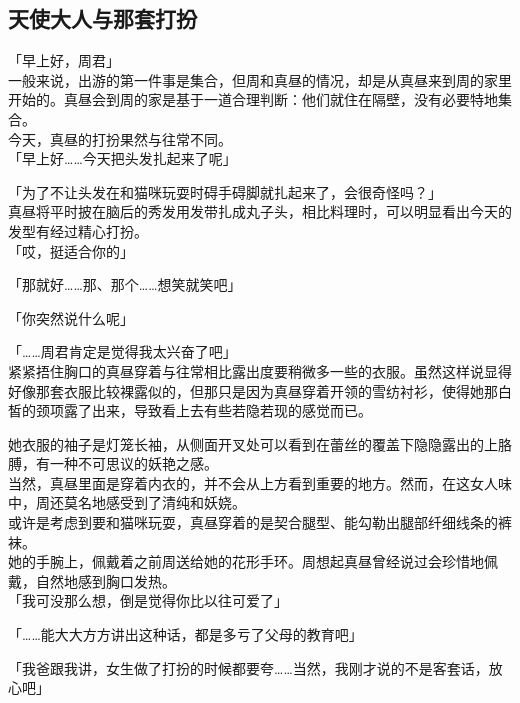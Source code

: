 \subsection{天使大人与那套打扮}

「早上好，周君」\\

一般来说，出游的第一件事是集合，但周和真昼的情况，却是从真昼来到周的家里开始的。真昼会到周的家是基于一道合理判断：他们就住在隔壁，没有必要特地集合。\\

今天，真昼的打扮果然与往常不同。\\

「早上好……今天把头发扎起来了呢」

「为了不让头发在和猫咪玩耍时碍手碍脚就扎起来了，会很奇怪吗？」\\

真昼将平时披在脑后的秀发用发带扎成丸子头，相比料理时，可以明显看出今天的发型有经过精心打扮。\\

「哎，挺适合你的」

「那就好……那、那个……想笑就笑吧」

「你突然说什么呢」

「……周君肯定是觉得我太兴奋了吧」\\

紧紧捂住胸口的真昼穿着与往常相比露出度要稍微多一些的衣服。虽然这样说显得好像那套衣服比较裸露似的，但那只是因为真昼穿着开领的雪纺衬衫，使得她那白皙的颈项露了出来，导致看上去有些若隐若现的感觉而已。

她衣服的袖子是灯笼长袖，从侧面开叉处可以看到在蕾丝的覆盖下隐隐露出的上胳膊，有一种不可思议的妖艳之感。\\

当然，真昼里面是穿着内衣的，并不会从上方看到重要的地方。然而，在这女人味中，周还莫名地感受到了清纯和妖娆。\\

或许是考虑到要和猫咪玩耍，真昼穿着的是契合腿型、能勾勒出腿部纤细线条的裤袜。\\

她的手腕上，佩戴着之前周送给她的花形手环。周想起真昼曾经说过会珍惜地佩戴，自然地感到胸口发热。\\

「我可没那么想，倒是觉得你比以往可爱了」

「……能大大方方讲出这种话，都是多亏了父母的教育吧」

「我爸跟我讲，女生做了打扮的时候都要夸……当然，我刚才说的不是客套话，放心吧」

